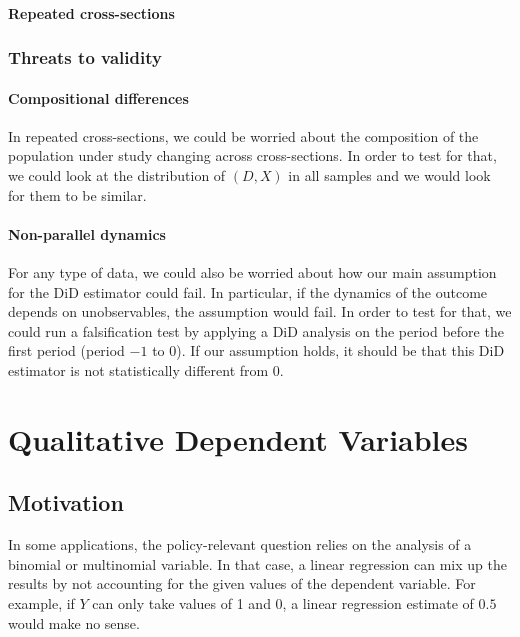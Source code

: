 \documentclass[12pt]{report}
\begin{document}
\subsubsection{Repeated cross-sections}



\subsection{Threats to validity}

\subsubsection{Compositional differences}

In repeated cross-sections, we could be worried about the composition of the population under study changing across cross-sections. In order to test for that, we could look at the distribution of $(D, X)$ in all samples and we would look for them to be similar.

\subsubsection{Non-parallel dynamics}

For any type of data, we could also be worried about how our main assumption for the DiD estimator could fail. In particular, if the dynamics of the outcome depends on unobservables, the assumption would fail. In order to test for that, we could run a falsification test by applying a DiD analysis on the period before the first period (period $-1$ to $0$). If our assumption holds, it should be that this DiD estimator is not statistically different from 0.

\chapter{Qualitative Dependent Variables}

\section{Motivation}

In some applications, the policy-relevant question relies on the analysis of a binomial or multinomial variable. In that case, a linear regression can mix up the results by not accounting for the given values of the dependent variable. For example, if $Y$ can only take values of 1 and 0, a linear regression estimate of $0.5$ would make no sense.
\end{document}
